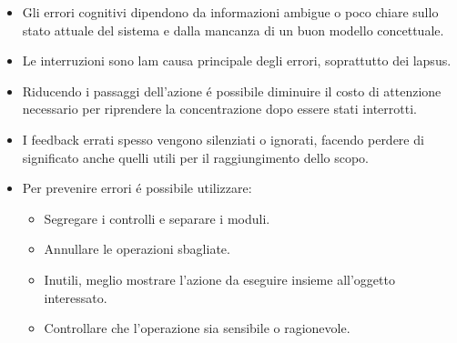\begin{itemize}
\begin{itemize}
        \item Rendere pi\`u semplice la scoperta e comprensione degli errori
        \item Aiutare l'utente a compiere correttamente l'azione
    \end{itemize}
    \item Gli errori cognitivi dipendono da informazioni ambigue o poco chiare sullo stato attuale del sistema e dalla mancanza di un buon modello concettuale.
    \item Le interruzioni sono lam causa principale degli errori, soprattutto dei lapsus.
    \item Riducendo i passaggi dell'azione \'e possibile diminuire il costo di attenzione necessario per riprendere la concentrazione dopo essere stati interrotti.
    \item I feedback errati spesso vengono silenziati o ignorati, facendo perdere di significato anche quelli utili per il raggiungimento dello scopo.
    \item Per prevenire errori \'e possibile utilizzare:
    \begin{itemize}
        \item {} Segregare i controlli e separare i moduli.
        \item {} Annullare le operazioni sbagliate.
        \item {} Inutili, meglio mostrare l'azione da eseguire insieme all'oggetto interessato.
        \item {} Controllare che l'operazione sia sensibile o ragionevole.
    \end{itemize}
    
\end{itemize}
